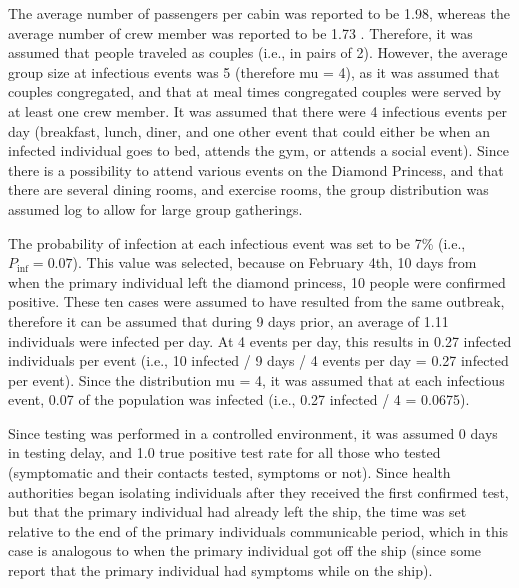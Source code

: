\documentclass[sr]{drdc-report}
\def\Pinf{\ensuremath{P_\mathrm{inf}}}
\begin{document}
The average number of passengers per cabin was reported to be 1.98, whereas the average number of crew member was reported to be 1.73 \cite{10..15585/mmwr..mm6912e3}.  Therefore, it was assumed that people traveled as couples (i.e., in pairs of 2). However, the average group size at infectious events was 5 (therefore mu = 4), as it was assumed that couples congregated, and that at meal times congregated couples were served by at least one crew member. It was assumed that there were 4 infectious events per day (breakfast, lunch, diner, and one other event that could either be when an infected individual goes to bed, attends the gym, or attends a social event). Since there is a possibility to attend various events on the Diamond Princess, and that there are several dining rooms, and exercise rooms, the group distribution was assumed log to allow for large group gatherings. 

The probability of infection at each infectious event was set to be 7\% (i.e., $\Pinf = 0.07$). This value was selected, because on February 4th, 10 days from when the primary individual left the diamond princess, 10 people were confirmed positive. These ten cases were assumed to have resulted from the same outbreak, therefore it can be assumed that during 9 days prior, an average of 1.11 individuals were infected per day. At 4 events per day, this results in 0.27 infected individuals per event (i.e., 10 infected / 9 days / 4 events per day = 0.27 infected per event). Since the distribution mu = 4, it was assumed that at each infectious event, 0.07 of the population was infected (i.e., 0.27 infected / 4  = 0.0675).

Since testing was performed in a controlled environment, it was assumed 0 days in testing delay, and 1.0 true positive test rate for all those who tested (symptomatic and their contacts tested, symptoms or not). Since health authorities began isolating individuals after they received the first confirmed test, but that the primary individual had already left the ship, the time was set relative to the end of the primary individuals communicable period, which in this case is analogous to when the primary individual got off the ship (since some report that the primary individual had symptoms while on the ship). 
\end{document}
